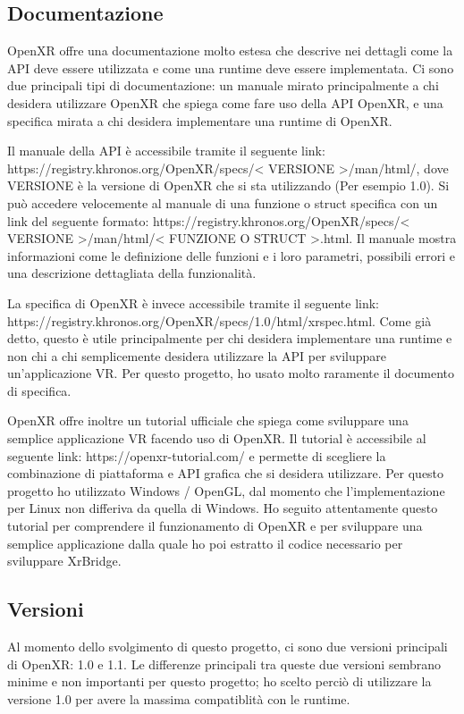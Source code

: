 \documentclass[twoside]{supsistudent}
\begin{document}
\subsection{Documentazione}

OpenXR offre una documentazione molto estesa che descrive nei dettagli come la API deve essere utilizzata e come una runtime deve essere implementata. Ci sono due principali tipi di documentazione: un manuale mirato principalmente a chi desidera utilizzare OpenXR che spiega come fare uso della API OpenXR, e una specifica mirata a chi desidera implementare una runtime di OpenXR.

Il manuale della API è accessibile tramite il seguente link: https://registry.khronos.org/OpenXR/specs/< VERSIONE >/man/html/, dove VERSIONE è la versione di OpenXR che si sta utilizzando (Per esempio 1.0). Si può accedere velocemente al manuale di una funzione o struct specifica con un link del seguente formato: https://registry.khronos.org/OpenXR/specs/< VERSIONE >/man/html/< FUNZIONE O STRUCT >.html. Il manuale mostra informazioni come le definizione delle funzioni e i loro parametri, possibili errori e una descrizione dettagliata della funzionalità.

La specifica di OpenXR è invece accessibile tramite il seguente link: https://registry.khronos.org/OpenXR/specs/1.0/html/xrspec.html. Come già detto, questo è utile principalmente per chi desidera implementare una runtime e non chi a chi semplicemente desidera utilizzare la API per sviluppare un'applicazione VR. Per questo progetto, ho usato molto raramente il documento di specifica.

OpenXR offre inoltre un tutorial ufficiale che spiega come sviluppare una semplice applicazione VR facendo uso di OpenXR. Il tutorial è accessibile al seguente link: https://openxr-tutorial.com/ e permette di scegliere la combinazione di piattaforma e API grafica che si desidera utilizzare. Per questo progetto ho utilizzato Windows / OpenGL, dal momento che l'implementazione per Linux non differiva da quella di Windows. Ho seguito attentamente questo tutorial per comprendere il funzionamento di OpenXR e per sviluppare una semplice applicazione dalla quale ho poi estratto il codice necessario per sviluppare XrBridge.

\subsection{Versioni}

Al momento dello svolgimento di questo progetto, ci sono due versioni principali di OpenXR: 1.0 e 1.1. Le differenze principali tra queste due versioni sembrano minime e non importanti per questo progetto; ho scelto perciò di utilizzare la versione 1.0 per avere la massima compatiblità con le runtime.
\end{document}
